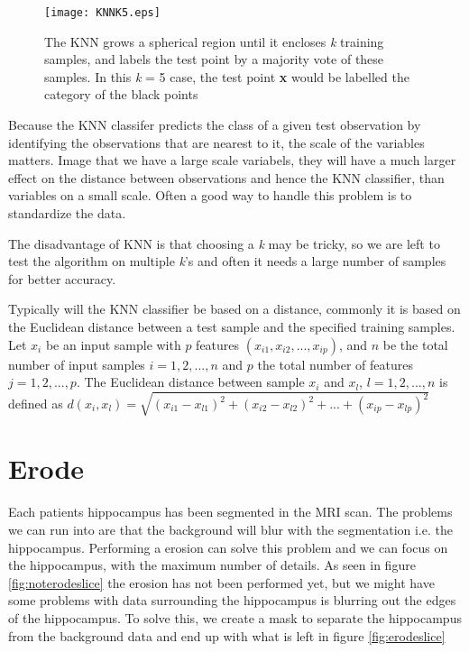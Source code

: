 \begin{figure}[H]
  \centering
  \texttt{[image: KNNK5.eps]}
  \caption{The KNN grows a spherical region until it encloses \textit{k} training samples, and labels the test point by a majority vote of these samples. In this \textit{k} = 5 case, the test point \textbf{x} would be labelled the category of the black points}\label{fig:KNNK5}
\end{figure}

Because the KNN classifer predicts the class of a given test observation by identifying the observations that are nearest to it, the scale of the variables matters. Image that we have a large scale variabels, they will have a much larger effect on the distance between observations and hence the KNN classifier, than variables on a small scale. Often a good way to handle this problem is to standardize the data.

The disadvantage of KNN is that choosing a \textit{k} may be tricky, so we are left to test the algorithm on multiple \textit{k}'s and often it needs a large number of samples for better accuracy.

Typically will the KNN classifier be based on a distance, commonly it is based on the Euclidean distance between a test sample and the specified training samples. Let $x_i$ be an input sample with $p$ features $(x_{i1}, x_{i2},...,x_{ip})$, and $n$ be the total number of input samples $i=1,2,...,n$ and $p$ the total number of features $j=1,2,...,p$. The Euclidean distance between sample $x_i$ and $x_l$, $l=1,2,...,n$ is defined as $d(x_i,x_l) = \sqrt{(x_{i1}-x_{l1})^2+(x_{i2}-x_{l2})^2+...+(x_{ip}-x_{lp})^2}$

\section{Erode}

Each patients hippocampus has been segmented in the MRI scan. The problems we can run into are that the background will blur with the segmentation i.e. the hippocampus. Performing a erosion can solve this problem and we can focus on the hippocampus, with the maximum number of details. As seen in figure \ref{fig:noterodeslice} the erosion has not been performed yet, but we might have some problems with data surrounding the hippocampus is blurring out the edges of the hippocampus. To solve this, we create a mask to separate the hippocampus from the background data and end up with what is left in figure \ref{fig:erodeslice}

